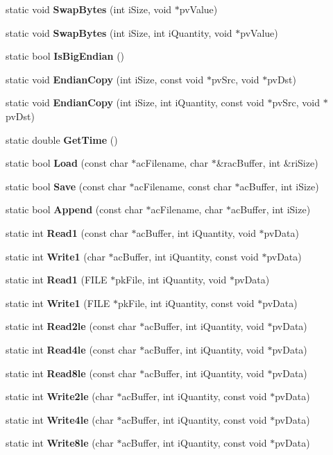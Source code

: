 \begin{CompactItemize}
\item 
static void {\bf Swap\-Bytes} (int i\-Size, void $\ast$pv\-Value)
\item 
static void {\bf Swap\-Bytes} (int i\-Size, int i\-Quantity, void $\ast$pv\-Value)
\item 
static bool {\bf Is\-Big\-Endian} ()
\item 
static void {\bf Endian\-Copy} (int i\-Size, const void $\ast$pv\-Src, void $\ast$pv\-Dst)
\item 
static void {\bf Endian\-Copy} (int i\-Size, int i\-Quantity, const void $\ast$pv\-Src, void $\ast$pv\-Dst)
\item 
static double {\bf Get\-Time} ()
\item 
static bool {\bf Load} (const char $\ast$ac\-Filename, char $\ast$\&rac\-Buffer, int \&ri\-Size)
\item 
static bool {\bf Save} (const char $\ast$ac\-Filename, const char $\ast$ac\-Buffer, int i\-Size)
\item 
static bool {\bf Append} (const char $\ast$ac\-Filename, char $\ast$ac\-Buffer, int i\-Size)
\item 
static int {\bf Read1} (const char $\ast$ac\-Buffer, int i\-Quantity, void $\ast$pv\-Data)
\item 
static int {\bf Write1} (char $\ast$ac\-Buffer, int i\-Quantity, const void $\ast$pv\-Data)
\item 
static int {\bf Read1} (FILE $\ast$pk\-File, int i\-Quantity, void $\ast$pv\-Data)
\item 
static int {\bf Write1} (FILE $\ast$pk\-File, int i\-Quantity, const void $\ast$pv\-Data)
\item 
static int {\bf Read2le} (const char $\ast$ac\-Buffer, int i\-Quantity, void $\ast$pv\-Data)
\item 
static int {\bf Read4le} (const char $\ast$ac\-Buffer, int i\-Quantity, void $\ast$pv\-Data)
\item 
static int {\bf Read8le} (const char $\ast$ac\-Buffer, int i\-Quantity, void $\ast$pv\-Data)
\item 
static int {\bf Write2le} (char $\ast$ac\-Buffer, int i\-Quantity, const void $\ast$pv\-Data)
\item 
static int {\bf Write4le} (char $\ast$ac\-Buffer, int i\-Quantity, const void $\ast$pv\-Data)
\item 
static int {\bf Write8le} (char $\ast$ac\-Buffer, int i\-Quantity, const void $\ast$pv\-Data)
\item 

\end{CompactItemize}
